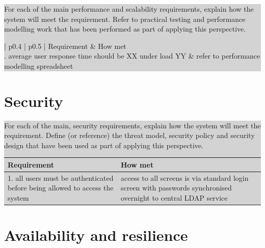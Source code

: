 \documentclass[a4paper,11pt]{report}
\newcommand{\instructions}[1]{
  \noindent\colorbox{lightgray}{%
    \parbox{\linewidth}{%
      #1
    }%
  }%
 \vspace{0.1cm}
}
\begin{document}
\instructions{
For each of the main performance and scalability requirements, explain
how the system will meet the requirement. Refer to practical testing
and performance modelling work that has been performed as part of
applying this perspective.

\begin{center}
  \begin{tabular}[h!]{| p{0.4\textwidth} | p{0.5\textwidth} |}
    \hline
    \rowcolor{gray}
    Requirement & How met \\
    \hline
    \hline
    1. average user response time should be XX under load YY & refer
    to performance modelling spreadsheet\\

    \hline
 \end{tabular}
\end{center}

}

\section{Security}
\label{sec:security}

\instructions{
For each of the main, security requirements, explain how the system
will meet the requirement. Define (or reference) the threat model,
security policy and security design that have been used as part of
applying this perspective.

\begin{center}
  \begin{tabular}[h!]{| p{0.4\textwidth} | p{0.5\textwidth} |}
    \hline
    \rowcolor{gray}
    Requirement & How met \\
    \hline
    \hline
    1. all users must be authenticated before being allowed to access
    the system & access to all screens is via standard login screen
    with passwords synchronised overnight to central LDAP service\\

    \hline
 \end{tabular}
\end{center}

}


\section{Availability and resilience}
\label{sec:avail-resil}
\end{document}
